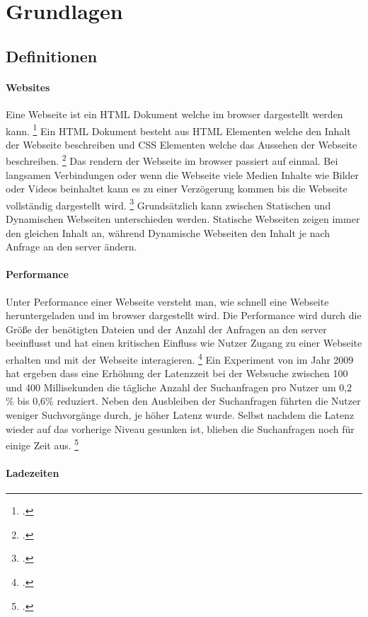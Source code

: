 \section{Grundlagen}
\subsection{Definitionen}
\paragraph*{Websites}
Eine Webseite ist ein \ac{HTML} Dokument welche im \gls{browser} dargestellt werden kann. \footcite[Vgl.][Seite 27]{Robbins2018}
Ein \ac{HTML} Dokument besteht aus \ac{HTML} Elementen welche den Inhalt der Webseite beschreiben und \ac{CSS} Elementen welche das Aussehen der Webseite beschreiben. \footcite[Vgl.][Seite 29]{Robbins2018}
Das rendern der Webseite im \gls{browser} passiert auf einmal. Bei langsamen Verbindungen oder wenn die Webseite viele Medien Inhalte wie Bilder oder Videos beinhaltet kann es zu einer Verzögerung kommen bis die Webseite vollständig dargestellt wird. \footcite[Vgl.][Seite 31]{Robbins2018}
Grundsätzlich kann zwischen Statischen und Dynamischen Webseiten unterschieden werden. 
Statische Webseiten zeigen immer den gleichen Inhalt an, während Dynamische Webseiten den Inhalt je nach Anfrage an den \gls{server} ändern.

\paragraph*{Performance}
Unter Performance einer Webseite versteht man, wie schnell eine Webseite heruntergeladen und im \gls{browser} dargestellt wird. Die Performance wird durch die Größe der benötigten Dateien und der Anzahl der Anfragen an den \gls{server} 
beeinflusst und hat einen kritischen Einfluss wie Nutzer Zugang zu einer Webseite erhalten und mit der Webseite interagieren. \footcite[Vgl.][Seite 44]{Robbins2018}
Ein Experiment von  im Jahr 2009 hat ergeben dass eine Erhöhung der Latenzzeit bei der Websuche zwischen 100 und 400 Millisekunden die tägliche
Anzahl der Suchanfragen pro Nutzer um 0,2 \% bis 0,6\% reduziert. 
Neben den Ausbleiben der Suchanfragen führten die Nutzer weniger Suchvorgänge durch, je höher Latenz wurde. 
Selbst nachdem die Latenz wieder auf das vorherige Niveau gesunken ist, blieben die Suchanfragen noch für einige Zeit aus. \footcite[Vgl.][Seite 1]{Google2009}
\paragraph*{Ladezeiten}

